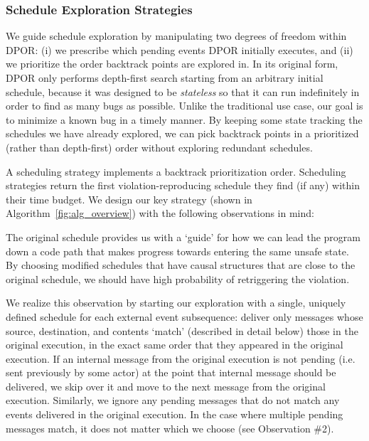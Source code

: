 \subsubsection{Schedule Exploration Strategies}
\label{subsec:exploration_strategies}

We guide schedule exploration by manipulating two degrees of freedom within
DPOR: (i) we prescribe which pending events DPOR initially
executes, and (ii) we prioritize the order backtrack points are explored in.
In its original form, DPOR only performs
depth-first search starting from an arbitrary initial schedule, because it was designed to be {\em
stateless} so that it can run indefinitely in order to find as
many bugs as possible. Unlike the traditional use case, our goal is to minimize a known bug in a
timely manner. By keeping some state tracking the schedules we have already explored, we can pick
backtrack points in a prioritized (rather than depth-first) order without exploring redundant schedules.

A scheduling strategy implements a backtrack prioritization order.
Scheduling strategies return the first violation-reproducing schedule they
find (if any) within their time budget. We design our key strategy (shown in
Algorithm~\ref{fig:alg_overview})
with the following observations in mind:

 The original schedule
provides us with a
`guide' for how we can lead the program down a code path that makes progress towards
entering the same unsafe state. By choosing modified schedules that have causal
structures that are close to the original schedule, we should have high
probability of retriggering the violation.

We realize this observation by starting our exploration with a single, uniquely
defined schedule for each external event subsequence: deliver only messages
whose source, destination, and contents
`match' (described in detail below) those in the original execution, in the exact same order
that they appeared in the original execution. If an internal message from the
original execution is not pending (i.e. sent previously by some actor) at the
point that internal message should be delivered, we skip over it and
move to the next message from the original execution. Similarly, we
ignore any pending messages that do not match any events delivered in the original
execution. In the case where multiple pending messages match, it does not
matter which we choose (see Observation \#2).

